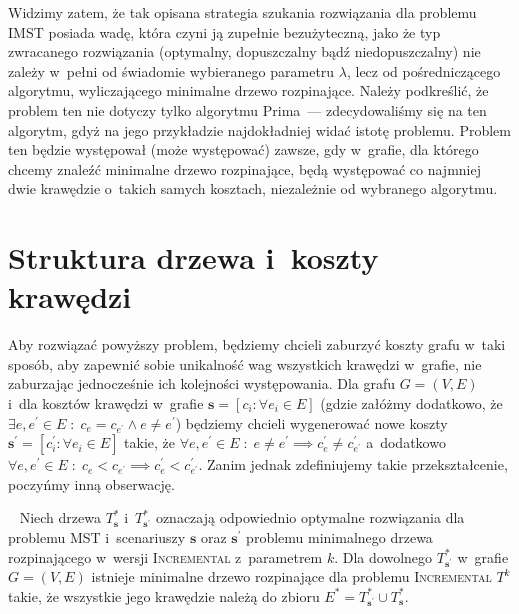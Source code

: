 Widzimy zatem, że tak opisana strategia szukania rozwiązania dla problemu \textsc{IMST} posiada wadę, która czyni ją zupełnie bezużyteczną, jako że typ zwracanego rozwiązania (optymalny, dopuszczalny bądź niedopuszczalny) nie zależy w~pełni od świadomie wybieranego parametru $\lambda$, lecz od pośredniczącego algorytmu, wyliczającego minimalne drzewo rozpinające.
Należy podkreślić, że problem ten nie dotyczy tylko algorytmu Prima~--- zdecydowaliśmy się na ten algorytm, gdyż na jego przykładzie najdokładniej widać istotę problemu.
Problem ten będzie występował (może występować) zawsze, gdy w~grafie, dla którego chcemy znaleźć minimalne drzewo rozpinające, będą występować co najmniej dwie krawędzie o~takich samych kosztach, niezależnie od wybranego algorytmu.




\section{Struktura drzewa i~koszty krawędzi}




Aby rozwiązać powyższy problem, będziemy chcieli zaburzyć koszty grafu w~taki sposób, aby zapewnić sobie unikalność wag wszystkich krawędzi w~grafie, nie zaburzając jednocześnie ich kolejności występowania.
Dla grafu $G = \left( V, E \right)$ i~dla kosztów krawędzi w~grafie $\textbf{s} = \left[ c_{i} : \forall e_{i} \in E \right]$ (gdzie załóżmy dodatkowo, że $\exists e, e^{\prime} \in E \; : \; c_{e} = c_{e^{\prime}} \wedge e \neq e^{\prime}$) będziemy chcieli wygenerować nowe koszty $\textbf{s}^{\prime} = \left[ c^{\prime}_{i} : \forall e_{i} \in E \right]$ takie, że $\forall e, e^{\prime} \in E \; : \; e \neq e^{\prime} \implies c^{\prime}_{e} \neq c^{\prime}_{e^{\prime}}$ a~dodatkowo $\forall e, e^{\prime} \in E \; : \; c_{e} < c_{e^{\prime}} \implies c^{\prime}_{e} < c^{\prime}_{e^{\prime}}$.
Zanim jednak zdefiniujemy takie przekształcenie, poczyńmy inną obserwację.

\begin{lemma}~\cite{incNetOpt}\label{lm:shrunkenGraph}
	Niech drzewa $T^{\ast}_{\textbf{s}}$ i~$T^{\ast}_{\textbf{s}^{\prime}}$ oznaczają odpowiednio optymalne rozwiązania dla problemu \textsc{MST} i~scenariuszy $\textbf{s}$ oraz $\textbf{s}^{\prime}$ problemu minimalnego drzewa rozpinającego w~wersji \textsc{Incremental} z~parametrem $k$.
	Dla dowolnego $T^{\ast}_{\textbf{s}^{\prime}}$ w~grafie $G = \left( V, E \right)$ istnieje minimalne drzewo rozpinające dla problemu \textsc{Incremental} $T^{k}$ takie, że wszystkie jego krawędzie należą do zbioru $E^{\ast} = T^{\ast}_{\textbf{s}^{\prime}} \cup T^{\ast}_{\textbf{s}}$.
\end{lemma}

